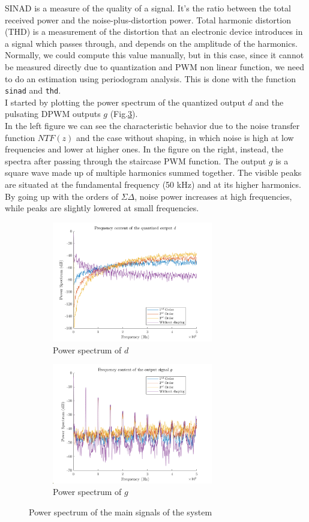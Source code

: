 \documentclass[11pt,a4paper]{article}
\begin{document}
SINAD is a measure of the quality of a signal. It's the ratio between the total received power and the noise-plus-distortion power. Total harmonic distortion (THD) is a measurement of the distortion that an electronic device introduces in a signal which passes through, and depends on the amplitude of the harmonics.
Normally, we could compute this value manually, but in this case, since it cannot be measured directly due to quantization and PWM non linear function, we need to do an estimation using periodogram analysis. This is done with the function \texttt{sinad} and \texttt{thd}. \\
I started by plotting the power spectrum of the quantized output $d$ and the pulsating DPWM outputs $g$ (Fig.\ref{spectrum}). \\
In the left figure we can see the characteristic behavior due to the noise transfer function $NTF(z)$ and the case without shaping, in which noise is high at low frequencies and lower at higher ones. In the figure on the right, instead, the spectra after passing through the staircase PWM function. The output $g$ is a square wave made up of multiple harmonics summed together. The visible peaks are situated at the fundamental frequency (50 kHz) and at its higher harmonics. By going up with the orders of $\Sigma\Delta$, noise power increases at high frequencies, while peaks are slightly lowered at small frequencies. 
\begin{figure}[H]
	\centering
	\begin{subfigure}[b]{0.45\textwidth}
		\centering
		\includegraphics[width=70mm]{images/powerspect_d.png}
		\caption{Power spectrum of $d$}
		\label{d}
	\end{subfigure}
	\begin{subfigure}[b]{0.45\textwidth}
		\centering
		\includegraphics[width=70mm]{images/powerspect_g.png}
		\caption{Power spectrum of $g$}
		\label{g}
	\end{subfigure}
	\caption{Power spectrum of the main signals of the system}
	\label{spectrum}
\end{figure}
\end{document}
